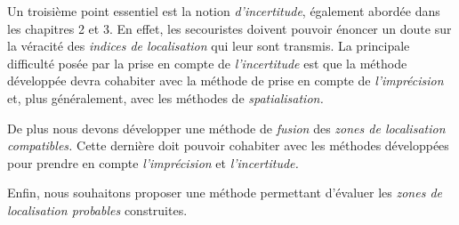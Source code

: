 Un troisième point essentiel est la notion \emph{d'incertitude},
également abordée dans les chapitres 2 et 3. En effet, les secouristes
doivent pouvoir énoncer un doute sur la véracité des \emph{indices de
  localisation} qui leur sont transmis. La principale difficulté posée
par la prise en compte de \emph{l'incertitude} est que la méthode
développée devra cohabiter avec la méthode de prise en compte de
\emph{l'imprécision} et, plus généralement, avec les méthodes de
\emph{spatialisation.}

De plus nous devons développer une méthode de \emph{fusion} des
\emph{zones de localisation compatibles.} Cette dernière doit pouvoir
cohabiter avec les méthodes développées pour prendre en compte
\emph{l'imprécision} et \emph{l'incertitude.}

Enfin, nous souhaitons proposer une méthode permettant d'évaluer les
\emph{zones de localisation probables} construites.



